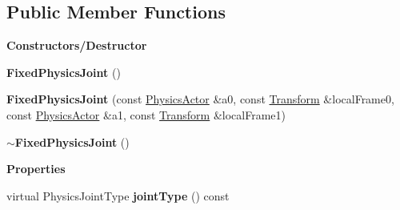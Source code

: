 \subsection*{Public Member Functions}
\begin{Indent}\textbf{ Constructors/\+Destructor}\par
\begin{DoxyCompactItemize}
\item 
\mbox{\label{classrev_1_1_fixed_physics_joint_aa3e91c7f1a4103da8deae5b7287fabc8}} 
{\bfseries Fixed\+Physics\+Joint} ()
\item 
\mbox{\label{classrev_1_1_fixed_physics_joint_aa9d79b6a053f4af538c7e24f3af93d6f}} 
{\bfseries Fixed\+Physics\+Joint} (const \mbox{\hyperlink{classrev_1_1_physics_actor}{Physics\+Actor}} \&a0, const \mbox{\hyperlink{classrev_1_1_transform}{Transform}} \&local\+Frame0, const \mbox{\hyperlink{classrev_1_1_physics_actor}{Physics\+Actor}} \&a1, const \mbox{\hyperlink{classrev_1_1_transform}{Transform}} \&local\+Frame1)
\item 
\mbox{\label{classrev_1_1_fixed_physics_joint_a09caa005d5960491e33a933b0f095092}} 
{\bfseries $\sim$\+Fixed\+Physics\+Joint} ()
\end{DoxyCompactItemize}
\end{Indent}
\begin{Indent}\textbf{ Properties}\par
\begin{DoxyCompactItemize}
\item 
\mbox{\label{classrev_1_1_fixed_physics_joint_adf022511940c4d113d0e80671012b592}} 
virtual Physics\+Joint\+Type {\bfseries joint\+Type} () const
\end{DoxyCompactItemize}
\end{Indent}
